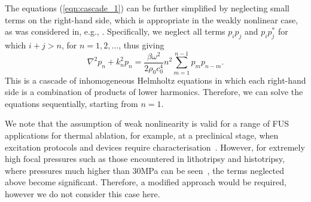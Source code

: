 \documentclass[11pt]{article}
\numberwithin{equation}{section}
\newcommand{\red}[1]{{\color{black} #1}}
\begin{document}
The equations (\ref{eqn:cascade_1}) can be further simplified by neglecting 
small terms on the right-hand side, which is appropriate in the weakly nonlinear
case, as was considered in, e.g., \cite{du2013fast}. Specifically, we neglect all terms $p_ip_j$
and $p_ip^*_j$ for which $i+j>n$, for $n=1,2,\ldots$, thus giving
\begin{equation}
    \nabla^2 p_n
    + k_n^2 p_n = \frac{\beta\omega^2}{2\rho_0 c_0^4}n^2
    \sum_{m=1}^{n-1}p_m p_{n-m}.
    \label{eqn:cascade_2}
\end{equation}
This is a cascade of inhomogeneous Helmholtz equations in which each right-hand 
side is a combination of products of lower harmonics. Therefore, we can solve 
the equations sequentially, starting from $n=1$.

We note that the assumption of weak nonlinearity is valid for a range of 
\red{FUS} applications for thermal ablation, \red{for example, at a preclinical stage, 
when excitation protocols and devices require characterisation~\cite{kothapalli2018convenient,ries2010real}.} 
However, for extremely high focal pressures such as those encountered in \red{lithotripsy and histotripsy, where pressures much higher 
than 30MPa can be seen~\cite{izadifar2017mechanical}}, the terms neglected above become significant. 
Therefore, a modified approach would be required, however we do not consider 
this case here.

\end{document}
